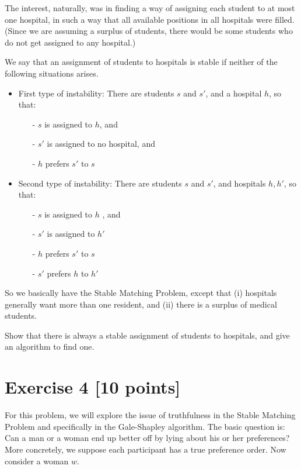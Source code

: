 \documentclass[11pt]{article}
\theoremstyle{theorem}
\theoremstyle{lemma}
\theoremstyle{corollary}
\theoremstyle{definition}
\begin{document}
The interest, naturally, was in finding a way of assigning each student
to at most one hospital, in such a way that all available positions in all
hospitals were filled. (Since we are assuming a surplus of students, there
would be some students who do not get assigned to any hospital.)

We say that an assignment of students to hospitals is stable if neither
of the following situations arises.

\begin{itemize}
    \item First type of instability: There are students $s$ and $s'$, and a hospital $h$,
so that:
\begin{itemize}
    \item[-] $s$ is assigned to $h$, and
     \item[-] $s'$ is assigned to no hospital, and
     \item[-] $h$ prefers $s'$ to $s$
\end{itemize}
    \item Second type of instability: There are students   $s$ and $s'$, and   hospitals $h,h'$,
so that:
\begin{itemize}
     \item[-] $s$  is assigned to  $h$ , and
     \item[-] $s'$  is assigned to $h'$ 
     \item[-] $h$  prefers $s'$ to $s$ 
     \item[-] $s'$  prefers $h$ to $h'$
\end{itemize}
\end{itemize} 
  
So we basically have the Stable Matching Problem, except that (i)
hospitals generally want more than one resident, and (ii) there is a surplus
of medical students. 

Show that there is always a stable assignment of students to hospitals,
and give an algorithm to find one.

 

\section*{Exercise 4 [10 points]}

For this problem, we will explore the issue of truthfulness in the Stable Matching Problem and specifically in the Gale-Shapley algorithm. The basic question is: Can a man or a woman end up better off by lying about his or her preferences? More concretely, we suppose each participant has a true preference order. Now consider a woman $w$.
\end{document}
